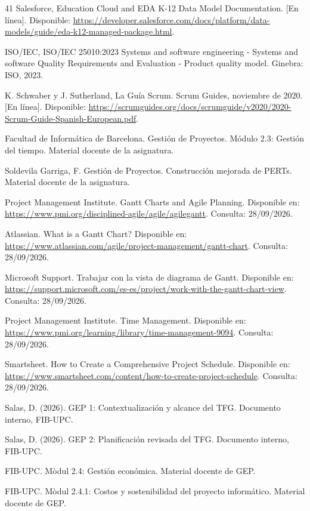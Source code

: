 \begin{thebibliography}{41}
 Salesforce, Education Cloud and EDA K-12 Data Model Documentation. [En línea]. Disponible: \url{https://developer.salesforce.com/docs/platform/data-models/guide/eda-k12-managed-package.html}.

 ISO/IEC, ISO/IEC 25010:2023 Systems and software engineering - Systems and software Quality Requirements and Evaluation - Product quality model. Ginebra: ISO, 2023.

 K. Schwaber y J. Sutherland, La Guía Scrum. Scrum Guides, noviembre de 2020. [En línea]. Disponible: \url{https://scrumguides.org/docs/scrumguide/v2020/2020-Scrum-Guide-Spanish-European.pdf}.

 Facultad de Informática de Barcelona. Gestión de Proyectos. Módulo 2.3: Gestión del tiempo. Material docente de la asignatura.

 Soldevila Garriga, F. Gestión de Proyectos. Construcción mejorada de PERTs. Material docente de la asignatura.

 Project Management Institute. Gantt Charts and Agile Planning. Disponible en: \url{https://www.pmi.org/disciplined-agile/agile/agilegantt}. Consulta: 28/09/2026.

 Atlassian. What is a Gantt Chart? Disponible en: \url{https://www.atlassian.com/agile/project-management/gantt-chart}. Consulta: 28/09/2026.

 Microsoft Support. Trabajar con la vista de diagrama de Gantt. Disponible en: \url{https://support.microsoft.com/es-es/project/work-with-the-gantt-chart-view}. Consulta: 28/09/2026.

 Project Management Institute. Time Management. Disponible en: \url{https://www.pmi.org/learning/library/time-management-9094}. Consulta: 28/09/2026.

 Smartsheet. How to Create a Comprehensive Project Schedule. Disponible en: \url{https://www.smartsheet.com/content/how-to-create-project-schedule}. Consulta: 28/09/2026.

 Salas, D. (2026). GEP 1: Contextualización y alcance del TFG. Documento interno, FIB-UPC.

 Salas, D. (2026). GEP 2: Planificación revisada del TFG. Documento interno, FIB-UPC.

 FIB-UPC. Mòdul 2.4: Gestión económica. Material docente de GEP.

 FIB-UPC. Mòdul 2.4.1: Costos y sostenibilidad del proyecto informático. Material docente de GEP.


\end{thebibliography}
